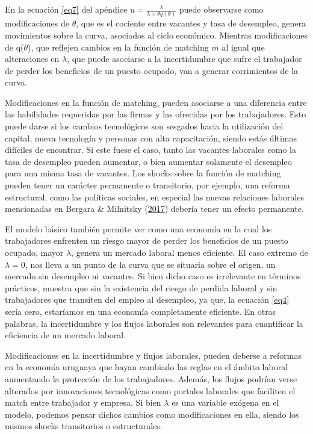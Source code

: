 \documentclass[12pt,oneside]{reedthesis}
\begin{document}
En la ecuación \eqref{eq7} del apéndice \(u = \frac{\lambda}{\lambda+\theta q(\theta)}\) puede observarse como modificaciones de \(\theta\), que es el cociente entre vacantes y tasa de desempleo, genera movimientos sobre la curva, asociados al ciclo económico. Mientras modificaciones de q(\(\theta\)), que reflejen cambios en la función de matching \(m\) al igual que alteraciones en \(\lambda\), que puede asociarse a la incertidumbre que sufre el trabajador de perder los beneficios de un puesto ocupado, van a generar corrimientos de la curva.

Modificaciones en la función de matching, pueden asociarse a una diferencia entre las habilidades requeridas por las firmas y las ofrecidas por los trabajadores. Esto puede darse si los cambios tecnológicos son sesgados hacia la utilización del capital, nueva tecnología y personas con alta capacitación, siendo estás últimas difíciles de encontrar. Si este fuese el caso, tanto las vacantes laborales como la tasa de desempleo pueden aumentar, o bien aumentar solamente el desempleo para una misma tasa de vacantes. Los shocks sobre la función de matching pueden tener un carácter permanente o transitorio, por ejemplo, una reforma estructural, como las políticas sociales, en especial las nuevas relaciones laborales mencionadas en Bergara \& Milnitsky (\protect\hyperlink{ref-Bergara2017}{2017}) debería tener un efecto permanente.

El modelo básico también permite ver como una economía en la cual los trabajadores enfrenten un riesgo mayor de perder los beneficios de un puesto ocupado, mayor \(\lambda\), genera un mercado laboral menos eficiente. El caso extremo de \(\lambda=0\), nos lleva a un punto de la curva que se situaría sobre el origen, un mercado sin desempleo ni vacantes. Si bien dicho caso es irrelevante en términos prácticos, muestra que sin la existencia del riesgo de perdida laboral y sin trabajadores que transiten del empleo al desempleo, ya que, la ecuación \eqref{eq4} sería cero, estaríamos en una economía completamente eficiente. En otras palabras, la incertidumbre y los flujos laborales son relevantes para cuantificar la eficiencia de un mercado laboral.

Modificaciones en la incertidumbre y flujos laborales, pueden deberse a reformas en la economía uruguaya que hayan cambiado las reglas en el ámbito laboral aumentando la protección de los trabajadores. Además, los flujos podrían verse alterados por innovaciones tecnológicas como portales laborales que faciliten el match entre trabajador y empresa. Si bien \(\lambda\) es una variable exógena en el modelo, podemos pensar dichos cambios como modificaciones en ella, siendo los mismos shocks transitorios o estructurales.
\end{document}
